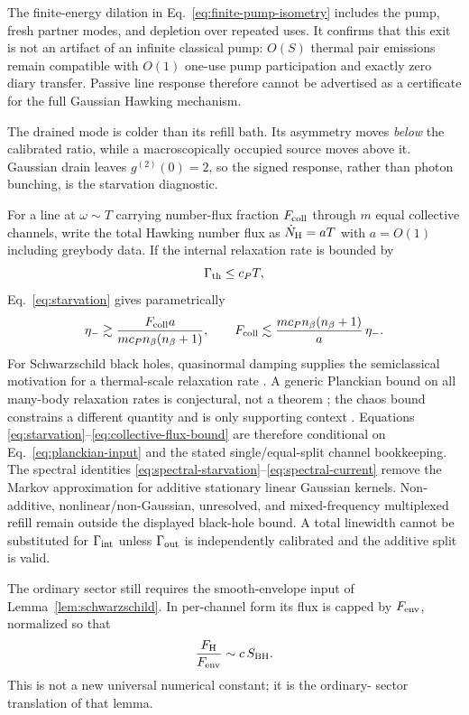 \documentclass[12pt]{article}
\newcommand{\be}{\begin{equation}}
\newcommand{\ee}{\end{equation}}
\begin{document}
The finite-energy dilation in Eq.~\eqref{eq:finite-pump-isometry} includes the
pump, fresh partner modes, and depletion over repeated uses.  It confirms that
this exit is not an artifact of an infinite classical pump: $O(S)$ thermal pair
emissions remain compatible with $O(1)$ one-use pump participation and exactly
zero diary transfer.  Passive line response therefore cannot be advertised as
a certificate for the full Gaussian Hawking mechanism.

The drained mode is colder than its refill bath.  Its asymmetry moves
\emph{below} the calibrated ratio, while a macroscopically occupied
source moves above it.  Gaussian drain leaves $g^{(2)}(0)=2$, so the
signed response, rather than photon bunching, is the starvation
diagnostic.

For a line at $\omega\sim T$ carrying number-flux fraction $F_{\rm coll}$
through $m$ equal collective channels, write the total Hawking number
flux as $\dot N_{\rm H}=aT$ with $a=O(1)$ including greybody data.
If the internal relaxation rate is bounded by
\be
  \Gamma_{\rm th}\leq c_P T,
\label{eq:planckian-input}
\ee
Eq.~\eqref{eq:starvation} gives parametrically
\be
  \eta_-
  \gtrsim
  \frac{F_{\rm coll}a}
       {m c_P n_\beta(n_\beta+1)},
  \qquad
  F_{\rm coll}
  \lesssim
  \frac{m c_P n_\beta(n_\beta+1)}{a}\,\eta_- .
\label{eq:collective-flux-bound}
\ee
For Schwarzschild black holes, quasinormal damping supplies the
semiclassical motivation for a thermal-scale relaxation rate
\cite{BertiCardosoStarinets2009}.  A generic Planckian bound on all
many-body relaxation rates is conjectural, not a theorem
\cite{HartnollMackenzie2022}; the chaos bound constrains a different
quantity and is only supporting context
\cite{MaldacenaShenkerStanford2016}.  Equations
\eqref{eq:starvation}--\eqref{eq:collective-flux-bound} are therefore
conditional on Eq.~\eqref{eq:planckian-input} and the stated
single/equal-split channel bookkeeping.  The spectral identities
\eqref{eq:spectral-starvation}--\eqref{eq:spectral-current} remove the
Markov approximation for additive stationary linear Gaussian kernels.
Non-additive, nonlinear/non-Gaussian, unresolved, and mixed-frequency
multiplexed refill remain outside the displayed black-hole bound.  A
total linewidth cannot be substituted for $\Gamma_{\rm int}$ unless
$\Gamma_{\rm out}$ is independently calibrated and the additive split
is valid.

The ordinary sector still requires the smooth-envelope input of
Lemma~\ref{lem:schwarzschild}.  In per-channel form its flux is capped by
$F_{\rm env}$, normalized so that
\be
  \frac{F_{\rm H}}{F_{\rm env}}\sim c\,S_{\rm BH}.
\ee
This is not a new universal numerical constant; it is the ordinary-
sector translation of that lemma.
\end{document}
